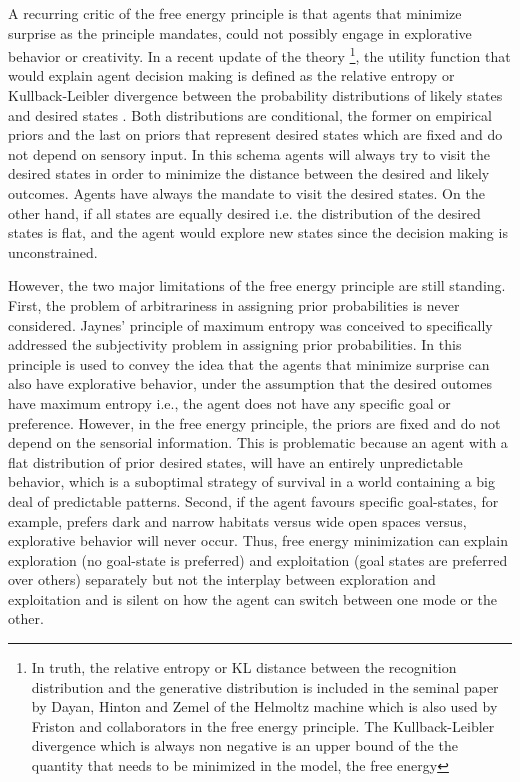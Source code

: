 \documentclass[11pt, onecolumn]{article}
\begin{document}
A recurring critic of the free energy principle is that agents that minimize surprise as the principle mandates, could not possibly engage in explorative  behavior or creativity. In a recent update of the theory \footnote{In truth, the relative entropy or KL distance between the recognition distribution and the generative distribution is included in the seminal paper by Dayan, Hinton and Zemel of the Helmoltz machine \citep{dayan_helmholtz_1995} which is also used by Friston and collaborators in the free energy principle. The Kullback-Leibler divergence which is always non negative is an upper
bound of the the quantity that needs to be minimized in the model, the free energy}, the utility function that would explain agent decision making is defined as the relative entropy or Kullback-Leibler divergence between the probability distributions of likely states and desired states \citep{schwartenbeck_exploration_2013}. Both distributions are conditional, the former on empirical priors and the last on priors that represent desired states which are fixed and do not depend on sensory input. In this schema agents will always try to visit the desired states in order to minimize the distance between the desired and likely outcomes. Agents have always the mandate to visit the  desired states. On the other hand, if all states are equally desired i.e. the distribution of the desired states is flat, and the agent would explore new states since the decision making is unconstrained.

However, the two major limitations  of the free energy principle are still standing. First, the problem of arbitrariness in assigning prior probabilities is 
never considered. Jaynes' \citep{Jaynes68priorprobabilities} principle of maximum entropy was conceived to specifically addressed the subjectivity problem in assigning prior probabilities. In \citep{schwartenbeck_exploration_2013} this principle is used to convey the idea that the agents that minimize surprise can also have explorative behavior, under the assumption that the desired outomes have maximum entropy i.e., the agent does not have any specific goal or preference. However, in the free energy principle, the priors are fixed and do not depend on the sensorial information. This is problematic because an agent with a flat distribution of prior desired states, will have an entirely unpredictable behavior, which is a suboptimal strategy of survival in a world containing a big deal of predictable patterns. Second, if the agent favours specific goal-states, for example, prefers dark and narrow habitats versus  wide open spaces versus, explorative behavior will never occur. Thus, free energy minimization can explain exploration (no goal-state is preferred) and exploitation (goal states are preferred over others) separately but not the interplay between exploration and exploitation and is silent on how the agent can switch between one mode or the other.
\end{document}
